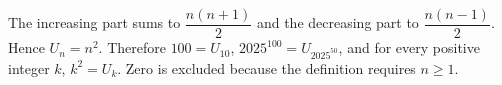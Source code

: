 The increasing part sums to $\dfrac{n(n+1)}{2}$ and the decreasing part to $\dfrac{n(n-1)}{2}$. Hence $U_n=n^2$. Therefore $100=U_{10}$, $2025^{100}=U_{2025^{50}}$, and for every positive integer $k$, $k^2=U_k$. Zero is excluded because the definition requires $n\ge1$.

